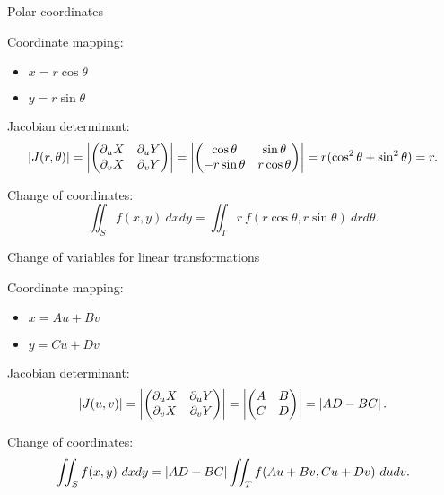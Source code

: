 {Polar coordinates}

Coordinate mapping:
\begin{itemize}
    \item  \(x = r \cos \theta\)
    \item  \(y = r \sin \theta\)
\end{itemize}

Jacobian determinant:
\[
    \left|J(r,\theta)\right|
    =
    \left|\begin{pmatrix}
            \partial_u X & \partial_u Y \\ \partial_v X & \partial_v Y
        \end{pmatrix}\right|
    =
    \left|\begin{pmatrix}
            \cos \theta & \sin \theta \\ -r\sin \theta & r\cos \theta
        \end{pmatrix}\right|
    = r ( \cos^2\theta + \sin^2 \theta) = r.
\]

Change of coordinates:
\[
    \iint_{S} f(x,y) \ dxdy = \iint_{T}  r  \ f(r\cos \theta, r\sin \theta)  \ drd\theta.
\]





{Change of variables for linear transformations}

Coordinate mapping:
\begin{itemize}
    \item \(x = Au + Bv\)
    \item \(y = Cu + Dv\)
\end{itemize}


Jacobian determinant:
\[
    \left|J(u,v)\right|
    =
    \left|\begin{pmatrix}
            \partial_u X & \partial_u Y \\ \partial_v X & \partial_v Y
        \end{pmatrix}\right|
    =
    \left|\begin{pmatrix}
            A & B \\ C & D
        \end{pmatrix}\right|
    = \left|AD - BC\right|.
\]

Change of coordinates:
\[
    \iint_{S} f(x,y) \ dxdy = \abs{AD - BC} \iint_{T}   f(Au + Bv,Cu + Dv)  \ dudv.
\]



% 




